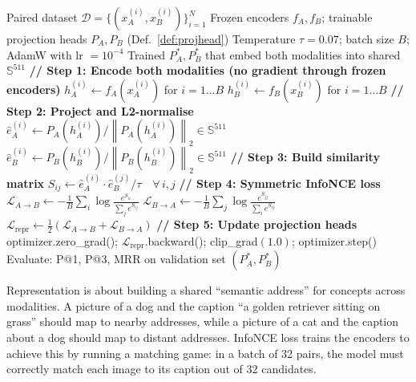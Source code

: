 \documentclass[12pt,a4paper]{article}
\theoremstyle{definition}
\theoremstyle{plain}
\theoremstyle{remark}
\newcommand{\Sph}{\mathbb{S}}
\newcommand{\Norm}[1]{\left\|#1\right\|}
\begin{document}
\begin{algorithm}[H]
\caption{Challenge 1: Multimodal Representation Learning (Coordinated Embedding)}
\label{alg:repr}
\begin{algorithmic}[1]
\Require Paired dataset $\mathcal{D} = \{(x_A^{(i)}, x_B^{(i)})\}_{i=1}^N$
\Require Frozen encoders $f_A, f_B$; trainable projection heads $P_A, P_B$ (Def.~\ref{def:projhead})
\Require Temperature $\tau = 0.07$; batch size $B$; AdamW with lr $= 10^{-4}$
\Ensure Trained $P_A^*, P_B^*$ that embed both modalities into shared $\Sph^{511}$
    \State \textbf{// Step 1: Encode both modalities (no gradient through frozen encoders)}
    \State $h_A^{(i)} \gets f_A(x_A^{(i)})$ for $i=1\ldots B$ 
    \State $h_B^{(i)} \gets f_B(x_B^{(i)})$ for $i=1\ldots B$ 
    \State \textbf{// Step 2: Project and L2-normalise}
    \State $\hat{e}_A^{(i)} \gets P_A(h_A^{(i)}) / \Norm{P_A(h_A^{(i)})}_2 \in \Sph^{511}$
    \State $\hat{e}_B^{(i)} \gets P_B(h_B^{(i)}) / \Norm{P_B(h_B^{(i)})}_2 \in \Sph^{511}$
    \State \textbf{// Step 3: Build similarity matrix}
    \State $S_{ij} \gets \hat{e}_A^{(i)} \cdot \hat{e}_B^{(j)} / \tau \quad \forall\, i,j$ 
    \State \textbf{// Step 4: Symmetric InfoNCE loss}
    \State $\mathcal{L}_{A \to B} \gets -\frac{1}{B}\sum_i \log\frac{e^{S_{ii}}}{\sum_j e^{S_{ij}}}$
    \State $\mathcal{L}_{B \to A} \gets -\frac{1}{B}\sum_j \log\frac{e^{S_{jj}}}{\sum_i e^{S_{ij}}}$
    \State $\mathcal{L}_{\text{repr}} \gets \frac{1}{2}(\mathcal{L}_{A \to B} + \mathcal{L}_{B \to A})$
    \State \textbf{// Step 5: Update projection heads}
    \State optimizer.zero\_grad(); $\mathcal{L}_{\text{repr}}$.backward(); clip\_grad$(1.0)$; optimizer.step()
  \EndFor
  \State Evaluate: P@1, P@3, MRR on validation set
\EndFor
\State \Return $(P_A^*, P_B^*)$
\end{algorithmic}
\end{algorithm}

\begin{tcolorbox}[laymanbox]
Representation is about building a shared ``semantic address'' for concepts across modalities. A picture of a dog and the caption ``a golden retriever sitting on grass'' should map to nearby addresses, while a picture of a cat and the caption about a dog should map to distant addresses. InfoNCE loss trains the encoders to achieve this by running a matching game: in a batch of 32 pairs, the model must correctly match each image to its caption out of 32 candidates.
\end{tcolorbox}
\end{document}
